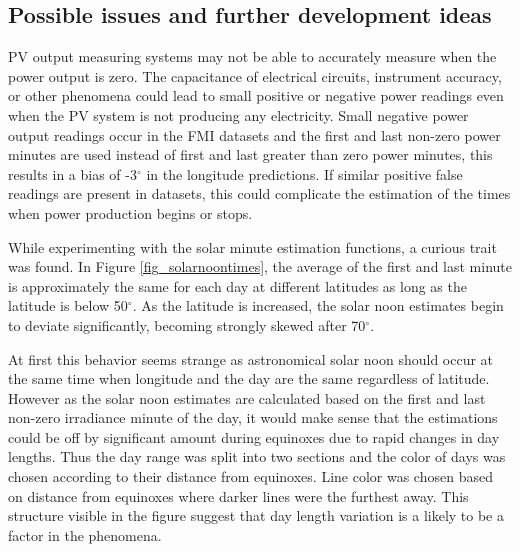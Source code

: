 



\newpage
\subsection{Possible issues and further development ideas}
PV output measuring systems may not be able to accurately measure when the power output is zero. The capacitance of electrical circuits, instrument accuracy, or other phenomena could lead to small positive or negative power readings even when the PV system is not producing any electricity. Small negative power output readings occur in the FMI datasets and the first and last non-zero power minutes are used instead of first and last greater than zero power minutes, this results in a bias of -3$^\circ$ in the longitude predictions. If similar positive false readings are present in datasets, this could complicate the estimation of the times when power production begins or stops.


While experimenting with the solar minute estimation functions, a curious trait was found. In Figure \ref{fig_solarnoontimes}, the average of the first and last minute is approximately the same for each day at different latitudes as long as the latitude is below 50$^\circ$. As the latitude is increased, the solar noon estimates begin to deviate significantly, becoming strongly skewed after 70$^\circ$. 

At first this behavior seems strange as astronomical solar noon should occur at the same time when longitude and the day are the same regardless of latitude. However as the solar noon estimates are calculated based on the first and last non-zero irradiance minute of the day, it would make sense that the estimations could be off by significant amount during equinoxes due to rapid changes in day lengths. Thus the day range was split into two sections and the color of days was chosen according to their distance from equinoxes. Line color was chosen based on distance from equinoxes where darker lines were the furthest away. This structure visible in the figure suggest that day length variation is a likely to be a factor in the phenomena. 


